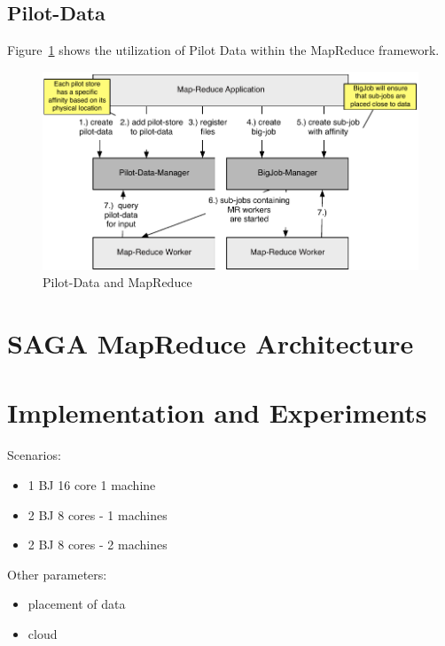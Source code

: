 \documentclass[conference,final]{IEEEtran}
\begin{document}
\subsection{Pilot-Data}
Figure~\ref{fig:extension_figures_pilot-data-mapreduce} shows the utilization of 
Pilot Data within the MapReduce framework.
\begin{figure}[htbp]
	\centering
	\includegraphics[width=\textwidth]{../extension/figures/pilot-data-mapreduce.pdf}
	\caption{Pilot-Data and MapReduce}
	\label{fig:extension_figures_pilot-data-mapreduce}
\end{figure}


\section{SAGA MapReduce Architecture}


\section{Implementation and Experiments}
Scenarios:
\begin{itemize}
	\item 1 BJ 16 core 1 machine
	\item 2 BJ 8 cores - 1 machines
	\item 2 BJ 8 cores - 2 machines
\end{itemize}



Other parameters:
\begin{itemize}
	\item placement of data
	\item cloud
\end{itemize}



\end{document}
